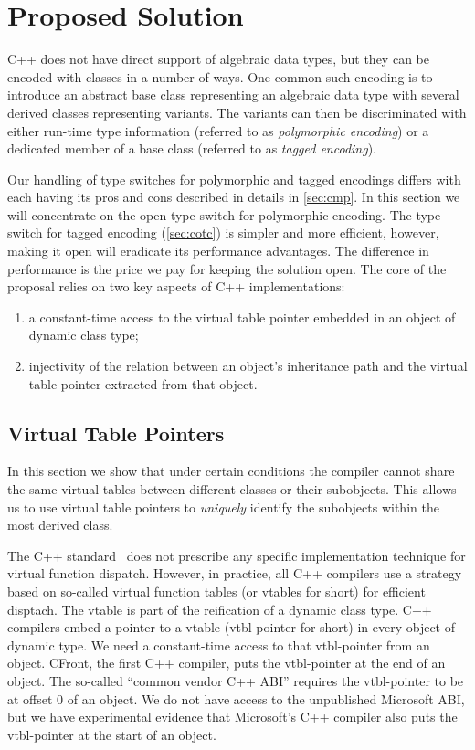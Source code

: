 \section{Proposed Solution}
\label{sec:copc}

C++ does not have direct support of algebraic data types, but they can be 
encoded with classes in a number of ways. One common such encoding is to 
introduce an abstract base class representing an algebraic data type with 
several derived classes representing variants. The variants can then be 
discriminated with either run-time type information (referred to as 
\emph{polymorphic encoding}) or a dedicated member of a base class 
(referred to  as \emph{tagged encoding}).

Our handling of type switches for polymorphic and tagged encodings differs 
with each having its pros and cons described in details in \textsection\ref{sec:cmp}.
In this section we will concentrate on the open type switch for 
polymorphic encoding. The type switch for tagged encoding (\textsection\ref{sec:cotc}) 
is simpler and more efficient, however, making it open will eradicate its 
performance advantages. The difference in performance is the price we pay for 
keeping the solution open.  The core of the proposal relies on two key
aspects of C++ implementations:
\begin{enumerate}
\item a constant-time access to the virtual table pointer embedded in an object of
  dynamic class type;
\item injectivity of the relation between an object's inheritance path
  and the virtual table pointer extracted from that object.
\end{enumerate}

\subsection{Virtual Table Pointers}
\label{sec:vtp}

In this section we show that under certain conditions the compiler cannot share 
the same virtual tables between different classes or their subobjects. This 
allows us to use virtual table pointers to \emph{uniquely} identify the 
subobjects within the most derived class.

The C++ standard~\cite{C++0x} does not prescribe any specific 
implementation technique for virtual function dispatch.
However, in practice, all C++ compilers use a strategy based on so-called
virtual function tables (or vtables for short) for efficient disptach. 
The vtable is part of the reification of a dynamic class type.  
 C++ compilers embed a pointer to a vtable (vtbl-pointer for short) in every object of
dynamic type.  We need a constant-time access to that vtbl-pointer
from an object.  CFront, the first C++ compiler, puts the vtbl-pointer
at the end of an object.  The so-called ``common vendor C++ ABI''
\cite{C++ABI} requires the vtbl-pointer to be at offset 0 of an object.
We do not have access to the unpublished Microsoft ABI, but we have
experimental evidence that Microsoft's C++ compiler also puts the vtbl-pointer 
at the start of an object.

